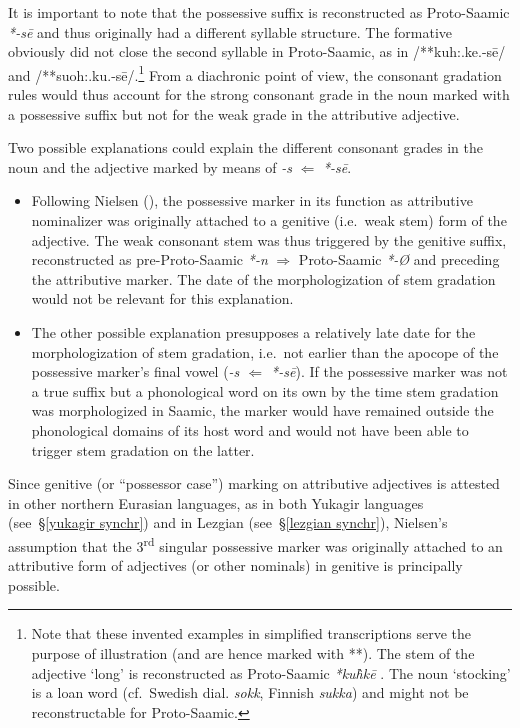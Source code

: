 {It is important to note that the possessive suffix is reconstructed as Proto-Saamic \textit{*-sē} \cite[73]{sammallahti1998b} and thus originally had a different syllable structure. The formative obviously did not close the second syllable in Proto-Saamic, as in /**kuh:.ke.-sē/ and /**suoh:.ku.-sē/.\footnote{Note that these invented examples in simplified transcriptions serve the purpose of illustration (and are hence marked with **). The stem of the adjective ‘long’ is reconstructed as Proto-Saamic \textit{*ku\`{h}kē} \cite[246]{sammallahti1998b}. The noun ‘stocking’ is a loan word (cf.~Swedish dial. \textit{sokk}, Finnish \textit{sukka}) and might not be reconstructable for Proto-Saamic.} From a diachronic point of view, the consonant gradation rules would thus account for the strong consonant grade in the noun marked with a possessive suffix but not for the weak grade in the attributive adjective.
 
Two possible explanations could explain the different consonant grades in the noun and the adjective marked by means of \textit{-s} $\Leftarrow$ \textit{*-sē}.
\begin{itemize}
\item Following Nielsen (\citeyear{nielsen1945b}), the possessive marker in its function as attributive nominalizer was originally attached to a genitive (i.e.~weak stem) form of the adjective. The weak consonant stem was thus triggered by the genitive suffix, reconstructed as pre-Proto-Saamic \textit{*-n} $\Rightarrow$ Proto-Saamic \mbox{\textit{*-Ø}} \cite[65]{sammallahti1998b} and preceding the attributive marker. The date of the morphologization of stem gradation would not be relevant for this explanation.
\item The other possible explanation presupposes a relatively late date for the morphologization of stem gradation, i.e.~not earlier than the apocope of the possessive marker's final vowel (\textit{-s $\Leftarrow$ *-sē}). If the possessive marker was not a true suffix but a phonological word on its own by the time stem gradation was morphologized in Saamic, the marker would have remained outside the phonological domains of its host word and would not have been able to trigger stem gradation on the latter. 
\end{itemize}
Since genitive (or “possessor case”) marking on attributive adjectives is attested in other northern Eurasian languages, as in both Yukagir languages (see~\S\ref{yukagir synchr}) and in Lezgian (see~\S\ref{lezgian synchr}), Nielsen's assumption that the 3\textsuperscript{rd} singular possessive marker was originally attached to an attributive form of adjectives (or other nominals) in genitive is principally possible. 

}
